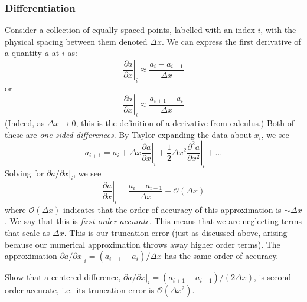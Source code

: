 \subsubsection{Differentiation}
\label{ch:intro:diff}
Consider a collection of equally spaced points, labelled with an index
$i$, with the physical spacing between them denoted $\Delta x$.  We
can express the first derivative of a quantity $a$ at 
$i$ as:
\begin{equation}
\left . \frac{\partial a}{\partial x} \right |_i \approx \frac{a_i - a_{i-1}}{\Delta x}
\end{equation}
or
\begin{equation}
\left . \frac{\partial a}{\partial x} \right |_i \approx \frac{a_{i+1} - a_i}{\Delta x}
\end{equation}
%
(Indeed, as $\Delta x \rightarrow 0$, this is the definition of a derivative from calculus.)
Both of these are {\em one-sided differences}.  By Taylor expanding the data
about $x_i$, we see
\begin{equation}
a_{i+1} = a_i + \Delta x \left . \frac{\partial a}{\partial x} \right |_i + \frac{1}{2} \Delta x^2 \left . \frac{\partial^2 a}{\partial x^2} \right |_i + \ldots
\end{equation}
Solving for ${\partial a}/{\partial x} |_i$, we see
\begin{equation}
\left . \frac{\partial a}{\partial x} \right |_i = \frac{a_i - a_{i-1}}{\Delta x} + \mathcal{O}(\Delta x)
\end{equation}
where $\mathcal{O}(\Delta x)$ indicates that the order of accuracy of
this approximation is $\sim \Delta x$.  We say that this is {\em first
  order accurate}.  This means that we are neglecting terms that scale
as $\Delta x$.  This is our truncation error (just as discussed above,
arising because our numerical approximation throws away higher order
terms).  The approximation ${\partial a}/{\partial x} |_i = ({a_{i+1}
  - a_i})/{\Delta x}$ has the same order of accuracy.

\begin{exercise}
{Show that a centered difference, ${\partial a}/
  {\partial x} |_i = ({a_{i+1} - a_{i-1}})/({2 \Delta x})$, is second order
accurate, i.e.\ its truncation error is $\mathcal{O}(\Delta x^2)$.}
\end{exercise}

